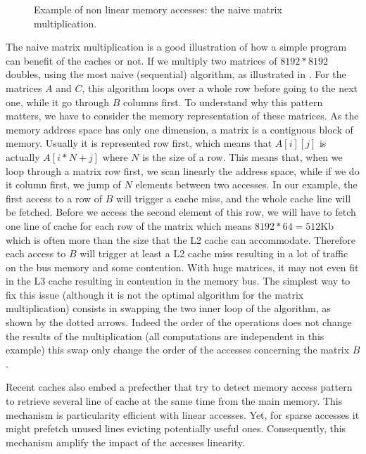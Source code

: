 \begin{figure}[htb]
    \centering
    
    \caption[Example of non linear memory accesses.]{Example of non linear memory accesses: the naive matrix multiplication.}
    \label{fig:mat-mult}
\end{figure}

The naive matrix multiplication is a good illustration of how a simple program can benefit of the caches or not.
If we multiply two matrices of $8192*8192$ doubles, using the most naive (sequential) algorithm, as illustrated in .
For the matrices $A$ and $C$, this algorithm loops over a whole row before going to the next one, while it go through $B$ columns first.
To understand why this pattern matters, we have to consider the memory representation of these matrices.
As the memory address space has only one dimension, a matrix is a contiguous block of memory.
Usually it is represented row first, which means that $A[i][j]$ is actually $A[i*N+j]$ where $N$ is the size of a row.
This means that, when we loop through a matrix row first, we scan linearly the address space, while if we do it column first, we jump of $N$ elements between two accesses.
In our example, the first access to a row of $B$ will trigger a cache miss, and the whole cache line will be fetched.
Before we access the second element of this row, we will have to fetch one line of cache for each row of the matrix which means $8192*64=512$Kb which is often more than the size that the L2 cache can accommodate.
Therefore each access to $B$ will trigger at least a L2 cache miss resulting in a lot of traffic on the bus memory and some contention.
With huge matrices, it may not even fit in the L3 cache resulting in contention in the memory bus.
The simplest way to fix this issue (although it is not the optimal algorithm for the matrix multiplication) consists in swapping the two inner loop of the algorithm, as shown by the dotted arrows.
Indeed the order of the operations does not change the results of the multiplication (all computations are independent in this example) this swap only change the order of the accesses concerning the matrix $B$.

Recent caches also embed a prefecther that try to detect memory access pattern to retrieve several line of cache at the same time from the main memory.
This mechanism is particularity efficient with linear accesses.
Yet, for sparse accesses it might prefetch unused lines evicting potentially useful ones.
Consequently, this mechanism amplify the impact of the accesses linearity.

